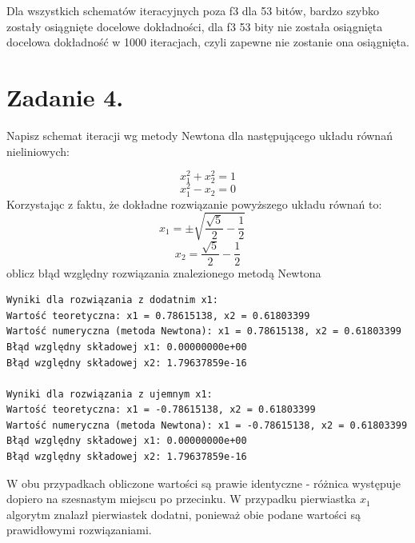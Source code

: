 \documentclass[
  letterpaper,
  DIV=11,
  numbers=noendperiod]{scrartcl}
\begin{document}
Dla wszystkich schematów iteracyjnych poza f3 dla 53 bitów, bardzo
szybko zostały osiągnięte docelowe dokładności, dla f3 53 bity nie
została osiągnięta docelowa dokładność w 1000 iteracjach, czyli zapewne
nie zostanie ona osiągnięta.

\section{Zadanie 4.}\label{zadanie-4.}

Napisz schemat iteracji wg metody Newtona dla następującego układu
równań nieliniowych:

\[ x_1^2 + x_2^2 = 1 \] \[ x_1^2 - x_2 = 0 \] Korzystając z faktu, że
dokładne rozwiązanie powyższego układu równań to:
\[ x_1 = \pm \sqrt{\frac{\sqrt{5}}{2} - \frac{1}{2}} \quad \]
\[ x_2 = \frac{\sqrt{5}}{2} - \frac{1}{2} \] oblicz błąd względny
rozwiązania znalezionego metodą Newtona

\begin{verbatim}
Wyniki dla rozwiązania z dodatnim x1:
Wartość teoretyczna: x1 = 0.78615138, x2 = 0.61803399
Wartość numeryczna (metoda Newtona): x1 = 0.78615138, x2 = 0.61803399
Błąd względny składowej x1: 0.00000000e+00
Błąd względny składowej x2: 1.79637859e-16

Wyniki dla rozwiązania z ujemnym x1:
Wartość teoretyczna: x1 = -0.78615138, x2 = 0.61803399
Wartość numeryczna (metoda Newtona): x1 = -0.78615138, x2 = 0.61803399
Błąd względny składowej x1: 0.00000000e+00
Błąd względny składowej x2: 1.79637859e-16
\end{verbatim}

W obu przypadkach obliczone wartości są prawie identyczne - różnica
występuje dopiero na szesnastym miejscu po przecinku. W przypadku
pierwiastka \(x_1\) algorytm znalazł pierwiastek dodatni, ponieważ obie
podane wartości są prawidłowymi rozwiązaniami.
\end{document}
